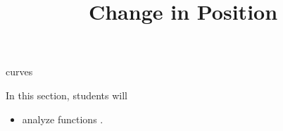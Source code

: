 \documentclass{ximera}
\title{Change in Position}
\begin{document}
\begin{abstract}
%
\end{abstract}
\maketitle










curves











\begin{sectionOutcomes}
In this section, students will 

\begin{itemize}
\item analyze functions .
\end{itemize}
\end{sectionOutcomes}
\end{document}
